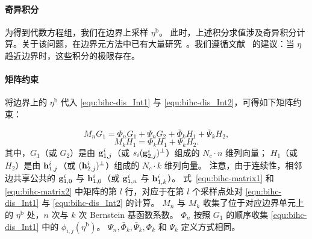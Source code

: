 \paragraph{奇异积分}
为得到代数方程组，我们在边界上采样 \(\eta^{\text{b}}\)。
%
此时，上述积分求值涉及奇异积分计算。关于该问题，在边界元方法中已有大量研究~\cite{Fischer1999ApplicationOH}。我们遵循文献~\cite{Weber2012} 的建议：当 \(\eta\) 趋近边界时，这些积分的极限存在。

\paragraph{矩阵约束}
将边界上的 \(\eta^{\text{b}}\) 代入 \eqref{equ:bihc-dis_Int1} 与 \eqref{equ:bihc-dis_Int2}，可得如下矩阵约束：

\begin{equation}\label{equ:bihc-matrix1}
    M_nG_1=\Phi_nG_1+\Psi_n G_2+\bar{\Phi}_k H_1+\bar{\Psi}_k H_2,
\end{equation}
\begin{equation}\label{equ:bihc-matrix2}
    M_k H_1=\Phi_k H_1+\Psi_k H_2.
\end{equation}
其中，\(G_1\)（或 \(G_2\)）是由 \(\mathbf{g}_{1,j}^i\)（或 \(s_i (\mathbf{g}_{2,j}^{i})^{\perp}\)）组成的 \(N_c\cdot n\) 维列向量；
\(H_1\)（或 \(H_2\)）是由 \(\mathbf{h}_{1,j}^i\)（或 \((\mathbf{h}_{2,j}^{i})^{\perp}\)）组成的 \(N_c\cdot k\) 维列向量。
注意，由于连续性，相邻边共享公共的 \(\mathbf{g}_{1,0}^i\) 与 \(\mathbf{h}_{1,0}^i\)（或 \(\mathbf{g}_{1,n}^i\) 与 \(\mathbf{h}_{1,k}^i\)）。
式~\eqref{equ:bihc-matrix1} 和 \eqref{equ:bihc-matrix2} 中矩阵的第 \(l\) 行，对应于在第 \(l\) 个采样点处对 \eqref{equ:bihc-dis_Int1} 与 \eqref{equ:bihc-dis_Int2} 的计算。
\(M_n\) 与 \(M_k\) 收集了位于对应边界单元上的 \(\eta^{\text{b}}\) 处，$n$ 次与 $k$ 次 Bernstein 基函数系数。
\(\Phi_n\) 按照 \(G_1\) 的顺序收集 \eqref{equ:bihc-dis_Int1} 中的 \(\phi_{i,j}(\eta^{\text{b}})\)。
\(\Psi_n,\bar{\Phi}_k,\bar{\Psi}_k,\Phi_k\) 和 \(\Psi_k\) 定义方式相同。



